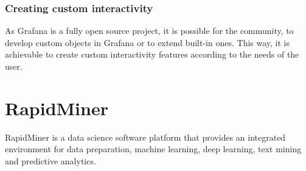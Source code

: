 \subsubsection{Creating custom interactivity}

As Grafana is a fully open source project, it is possible for the community, to develop custom objects in Grafana or to extend built-in ones. This way, it is achievable to create custom interactivity features according to the needs of the user.



\section{RapidMiner}


RapidMiner is a data science software platform that provides an integrated environment for data preparation, machine learning, deep learning, text mining and predictive analytics.

